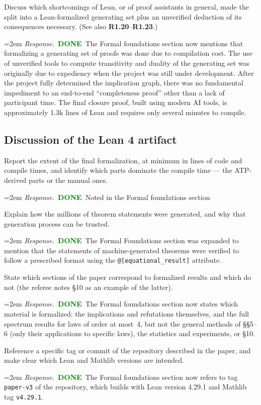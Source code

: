 \documentclass[11pt]{amsart}
\newcommand{\done}{\textcolor{green}{\textbf{DONE}}}
\newcommand{\response}[1]{%
  \par\smallskip
  \noindent\hangindent=2em\hangafter=1
  \textit{Response.}\ #1
  \par\smallskip}
\begin{document}
\begin{requests}
\item Discuss which shortcomings of Lean, or of proof assistants in general, made the
split into a Lean-formalized generating set plus an unverified deduction of its
consequences necessary. (See also \textbf{R1.20}--\textbf{R1.23}.)
\response{\done\ The Formal foundations section now mentions that formalizing a generating set of proofs was done due to compilation cost. The use of unverified tools to compute transitivity and duality of the generating set was originally due to expediency when the project was still under development.  After the project fully determined the implication graph, there was no fundamental impediment to an end-to-end ``completeness proof'' other than a lack of participant time.  The final closure proof, built using modern AI tools, is approximately 1.3k lines of Lean and requires only several minutes to compile.}

\end{requests}

\subsection*{Discussion of the Lean 4 artifact}

\begin{requests}[resume]

\item Report the extent of the final formalization, at minimum in lines of code and
compile times, and identify which parts dominate the compile time --- the
ATP-derived parts or the manual ones.
\response{\done\ Noted in the Formal foundations section}

\item Explain how the millions of theorem statements were generated, and why that
generation process can be trusted.
\response{\done\ The Formal Foundations section was expanded to mention that the statements of machine-generated theorems were verified to follow a prescribed format using the \texttt{@{[}equational\_result{]}} attribute.}

\item State which sections of the paper correspond to formalized results and which do
not (the referee notes \S10 as an example of the latter).
\response{\done\ The Formal foundations section now states which material is formalized: the implications and refutations themselves, and the full spectrum results for laws of order at most~4, but not the general methods of \S\S5--6 (only their applications to specific laws), the statistics and experiments, or \S10.}

\item Reference a specific tag or commit of the repository described in the paper,
and make clear which Lean and Mathlib versions are intended.
\response{\done\ The Formal foundations section now refers to tag \texttt{paper-v3} of the repository, which builds with Lean version 4.29.1 and Mathlib tag \texttt{v4.29.1}.}

\end{requests}
\end{document}
